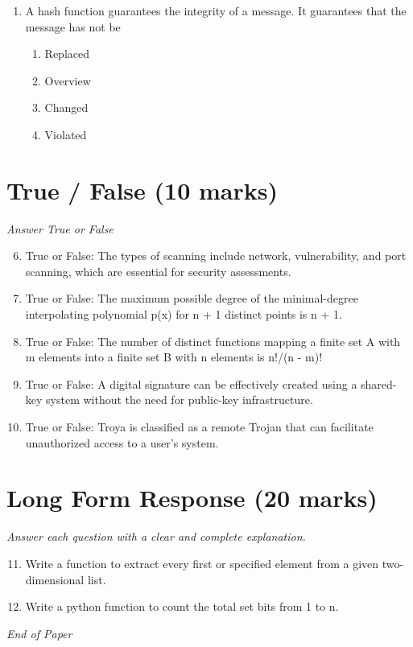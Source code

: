 \documentclass[12pt]{article}
\begin{document}
\begin{enumerate}[label=\arabic*.]
\begin{enumerate}[label=(\alph*)]
    \item Condition codes set by every instruction
    \item Variable-length encoding of instructions
    \item Instructions requiring widely varying numbers of cycles to execute
    \item Several different classes (sets) of registers
\end{enumerate}
\item A hash function guarantees the integrity of a message. It guarantees that the message has not be
\begin{enumerate}[label=(\alph*)]
    \item Replaced
    \item Overview
    \item Changed
    \item Violated
\end{enumerate}
\end{enumerate}

\section*{True / False (10 marks)}
\textit{Answer True or False}
\begin{enumerate}[label=\arabic*.]
\setcounter{enumi}{5}
\item True or False: The types of scanning include network, vulnerability, and port scanning, which are essential for security assessments.
\item True or False: The maximum possible degree of the minimal-degree interpolating polynomial p(x) for n + 1 distinct points is n + 1.
\item True or False: The number of distinct functions mapping a finite set A with m elements into a finite set B with n elements is n!/(n - m)!
\item True or False: A digital signature can be effectively created using a shared-key system without the need for public-key infrastructure.
\item True or False: Troya is classified as a remote Trojan that can facilitate unauthorized access to a user's system.
\end{enumerate}

\section*{Long Form Response (20 marks)}
\textit{Answer each question with a clear and complete explanation.}
\begin{enumerate}[label=\arabic*.]
\setcounter{enumi}{10}
\item Write a function to extract every first or specified element from a given two-dimensional list.
\item Write a python function to count the total set bits from 1 to n.
\end{enumerate}

\vfill
\noindent\textit{End of Paper}
\end{document}
